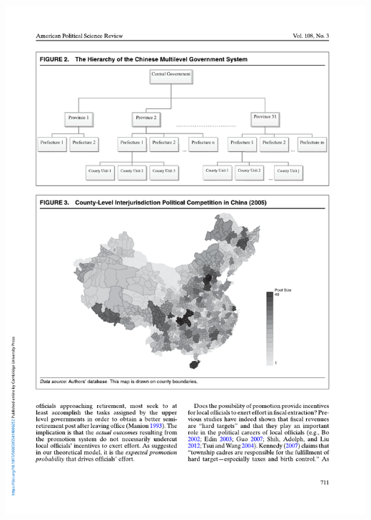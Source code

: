 \documentclass[
  10pt,
  ignorenonframetext,
]{beamer}
\begin{document}
\begin{frame}
\begin{center}\includegraphics[width=0.9\linewidth]{Figs/Examples/lu_fig2} \end{center}
\end{frame}
\end{document}
